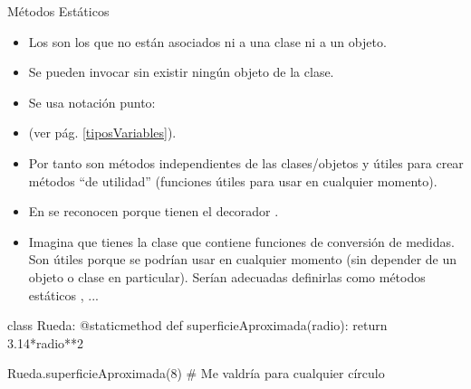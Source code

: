 \documentclass[10pt,envcountsect,spanish]{beamer}
\begin{document}
\begin{frame}[fragile, label={metodoEstatico}]{Métodos Estáticos} 

\begin{itemize}
\item Los  son los que no están asociados ni a una clase ni a un objeto.
\item Se pueden invocar sin existir ningún objeto de la clase.
\item Se usa notación punto: 
\item {} (ver pág. \ref{tiposVariables}).
\item Por tanto son métodos independientes de las clases/objetos y útiles para crear métodos ``de utilidad'' (funciones útiles para usar en cualquier momento).
\item En  se reconocen porque tienen el decorador .

\item[]
\unEjemplo Imagina que tienes la clase  que contiene funciones de conversión de medidas. Son útiles porque se podrían usar en cualquier momento (sin depender de un objeto o clase en particular). Serían adecuadas definirlas como métodos estáticos , ...
\end{itemize}

\footnotesize
\begin{pyconsole}[][frame=single]
class Rueda:
    @staticmethod
    def superficieAproximada(radio):
        return 3.14*radio**2

Rueda.superficieAproximada(8) # Me valdría para cualquier círculo
\end{pyconsole}
\end{frame}

\end{document}
